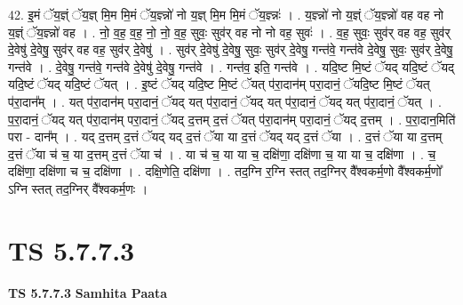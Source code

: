 \documentclass[17pt]{extarticle}
\begin{document}
42. इ॒मं ॅय॒ज्ञ्ं ॅय॒ज्ञ् मि॒म मि॒मं ॅय॒ज्ञ्न्नो॑ नो य॒ज्ञ् मि॒म मि॒मं ॅय॒ज्ञ्न्नः॑ । . य॒ज्ञ्न्नो॑ नो य॒ज्ञ्ं ॅय॒ज्ञ्न्नो॑ वह वह नो य॒ज्ञ्ं ॅय॒ज्ञ्न्नो॑ वह । . नो॒ व॒ह॒ व॒ह॒ नो॒ नो॒ व॒ह॒ सुवः॒ सुव॑र् वह नो नो वह॒ सुवः॑ । . व॒ह॒ सुवः॒ सुव॑र् वह वह॒ सुव॑र् दे॒वेषु॑ दे॒वेषु॒ सुव॑र् वह वह॒ सुव॑र् दे॒वेषु॑ । . सुव॑र् दे॒वेषु॑ दे॒वेषु॒ सुवः॒ सुव॑र् दे॒वेषु॒ गन्त॑वे॒ गन्त॑वे दे॒वेषु॒ सुवः॒ सुव॑र् दे॒वेषु॒ गन्त॑वे । . दे॒वेषु॒ गन्त॑वे॒ गन्त॑वे दे॒वेषु॑ दे॒वेषु॒ गन्त॑वे । . गन्त॑व॒ इति॒ गन्त॑वे । . यदि॒ष्ट मि॒ष्टं ॅयद् यदि॒ष्टं ॅयद् यदि॒ष्टं ॅयद् यदि॒ष्टं ॅयत् । . इ॒ष्टं ॅयद् यदि॒ष्ट मि॒ष्टं ॅयत् प॑रा॒दान॑म् परा॒दानं॒ ॅयदि॒ष्ट मि॒ष्टं ॅयत् प॑रा॒दान᳚म् । . यत् प॑रा॒दान॑म् परा॒दानं॒ ॅयद् यत् प॑रा॒दानं॒ ॅयद् यत् प॑रा॒दानं॒ ॅयद् यत् प॑रा॒दानं॒ ॅयत् । . प॒रा॒दानं॒ ॅयद् यत् प॑रा॒दान॑म् परा॒दानं॒ ॅयद् द॒त्तम् द॒त्तं ॅयत् प॑रा॒दान॑म् परा॒दानं॒ ॅयद् द॒त्तम् । . प॒रा॒दान॒मिति॑ परा - दान᳚म् । . यद् द॒त्तम् द॒त्तं ॅयद् यद् द॒त्तं ॅया या द॒त्तं ॅयद् यद् द॒त्तं ॅया । . द॒त्तं ॅया या द॒त्तम् द॒त्तं ॅया च॑ च॒ या द॒त्तम् द॒त्तं ॅया च॑ । . या च॑ च॒ या या च॒ दक्षि॑णा॒ दक्षि॑णा च॒ या या च॒ दक्षि॑णा । . च॒ दक्षि॑णा॒ दक्षि॑णा च च॒ दक्षि॑णा । . दक्षि॒णेति॒ दक्षि॑णा । . तद॒ग्नि र॒ग्नि स्तत् तद॒ग्निर् वै᳚श्वकर्म॒णो वै᳚श्वकर्म॒णो᳚ ऽग्नि स्तत् तद॒ग्निर् वै᳚श्वकर्म॒णः । \newline
\pagebreak
{}

\section{ TS 5.7.7.3 }

\textbf{TS 5.7.7.3 } \newline
\textbf{Samhita Paata} \newline
\end{document}

